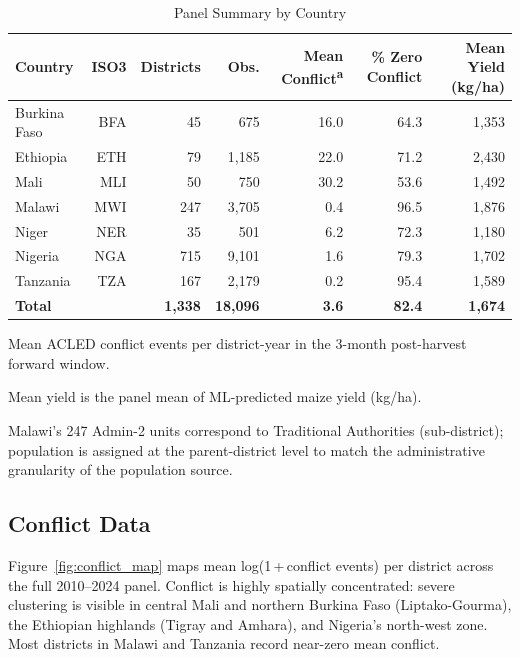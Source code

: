 \begin{table}[H]
\centering
\caption{Panel Summary by Country}
\label{tab:panel_summary}
\begin{threeparttable}
\begin{tabular}{lrrrrrr}
\toprule
Country & ISO3 & Districts & Obs. & Mean Conflict\textsuperscript{a} & \% Zero Conflict & Mean Yield (kg/ha) \\
\midrule
Burkina Faso &BFA &  45 &   675 & 16.0 & 64.3 & 1,353 \\
Ethiopia     &ETH &  79 & 1,185 & 22.0 & 71.2 & 2,430 \\
Mali         &MLI &  50 &   750 & 30.2 & 53.6 & 1,492 \\
Malawi       &MWI & 247 & 3,705 &  0.4 & 96.5 & 1,876 \\
Niger        &NER &  35 &   501 &  6.2 & 72.3 & 1,180 \\
Nigeria      &NGA & 715 & 9,101 &  1.6 & 79.3 & 1,702 \\
Tanzania     &TZA & 167 & 2,179 &  0.2 & 95.4 & 1,589 \\
\midrule
\textbf{Total} & & \textbf{1,338} & \textbf{18,096} & \textbf{3.6} & \textbf{82.4} & \textbf{1,674} \\
\bottomrule
\end{tabular}
\begin{tablenotes}
\footnotesize
\item[a] Mean ACLED conflict events per district-year in the 3-month post-harvest forward window.
\item Mean yield is the panel mean of ML-predicted maize yield (kg/ha).
\item Malawi's 247 Admin-2 units correspond to Traditional Authorities (sub-district); population is assigned at the parent-district level to match the administrative granularity of the population source.
\end{tablenotes}
\end{threeparttable}
\end{table}

\subsection{Conflict Data}

Figure~\ref{fig:conflict_map} maps mean log(1\,+\,conflict events) per district across the full 2010--2024 panel. Conflict is highly spatially concentrated: severe clustering is visible in central Mali and northern Burkina Faso (Liptako-Gourma), the Ethiopian highlands (Tigray and Amhara), and Nigeria's north-west zone. Most districts in Malawi and Tanzania record near-zero mean conflict.

